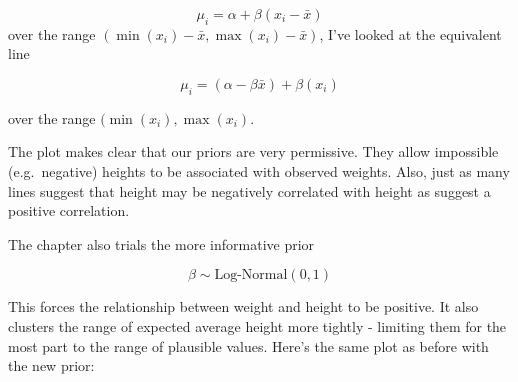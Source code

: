 \documentclass[
]{book}
\begin{document}
\[
\mu_i = \alpha + \beta(x_i - \bar{x}) 
\]
over the range \((\min( x_i) - \bar{x},\max( x_i) - \bar{x})\), I've looked at the equivalent line

\[
\mu_i = (\alpha - \beta\bar{x}) + \beta(x_i ) 
\]

over the range \((\min( x_i),\max( x_i)\).

The plot makes clear that our priors are very permissive. They allow impossible (e.g.~negative) heights to be associated with observed weights. Also, just as many lines suggest that height may be negatively correlated with height as suggest a positive correlation.

The chapter also trials the more informative prior

\[
\beta \sim \text{Log-Normal}(0,1)
\]

This forces the relationship between weight and height to be positive. It also clusters the range of expected average height more tightly - limiting them for the most part to the range of plausible values. Here's the same plot as before with the new prior:
\end{document}
